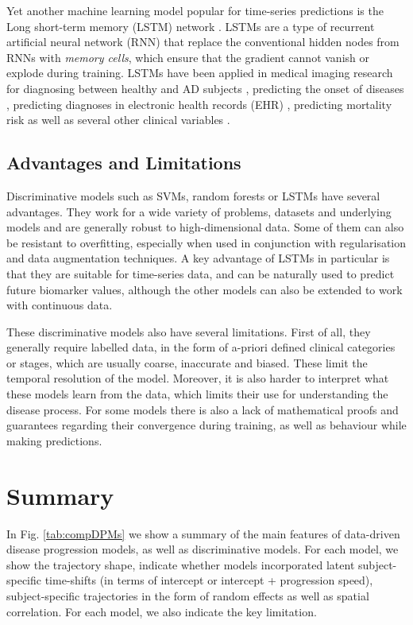 Yet another machine learning model popular for time-series predictions is the Long short-term memory (LSTM) network \cite{hochreiter1997long}. LSTMs are a type of recurrent artificial neural network (RNN) that replace the conventional hidden nodes from RNNs with \emph{memory cells}, which ensure that the gradient cannot vanish or explode during training. LSTMs have been applied in medical imaging research for diagnosing between healthy and AD subjects \cite{karlekar2018detecting}, predicting the onset of diseases \cite{razavian2016multi}, predicting diagnoses in electronic health records (EHR) \cite{lipton2015learning}, predicting mortality risk \cite{aczon2017dynamic} as well as several other clinical variables \cite{harutyunyan2017multitask}. 

\subsection{Advantages and Limitations}

Discriminative models such as SVMs, random forests or LSTMs have several advantages. They work for a wide variety of problems, datasets and underlying models and are generally robust to high-dimensional data. Some of them can also be resistant to overfitting, especially when used in conjunction with regularisation and data augmentation techniques. A key advantage of LSTMs in particular is that they are suitable for time-series data, and can be naturally used to predict future biomarker values, although the other models can also be extended to work with continuous data.

These discriminative models also have several limitations. First of all, they generally require labelled data, in the form of a-priori defined clinical categories or stages, which are usually coarse, inaccurate and biased. These limit the temporal resolution of the model. Moreover, it is also harder to interpret what these models learn from the data, which limits their use for understanding the disease process. For some models there is also a lack of mathematical proofs and guarantees regarding their convergence during training, as well as behaviour while making predictions.

\section{Summary}

In Fig. \ref{tab:compDPMs} we show a summary of the main features of data-driven disease progression models, as well as discriminative models. For each model, we show the trajectory shape, indicate whether models incorporated latent subject-specific time-shifts (in terms of intercept or intercept + progression speed), subject-specific trajectories in the form of random effects as well as spatial correlation. For each model, we also indicate the key limitation.

